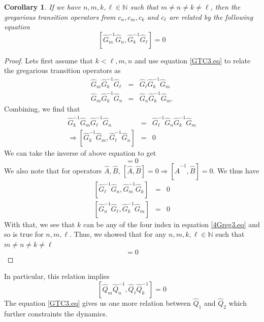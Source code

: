\documentclass[11pt]{article}
\newtheorem{corollary}[theorem]{Corollary}
\newcommand{\h}{\hat}
\begin{document}
\begin{corollary}
If we have $n,m,k,\ell\in \mathbb{N}$ such that $m\neq n \neq k \neq \ell $, then the gregarious transition operators from $c_n, c_m,c_k$ and $c_\ell$ are related by the following equation
\begin{equation}\label{4Greg3.eq}
[\h G_m^{-1}\h G_n,\h G_k^{-1}\h G_\ell]=0 
\end{equation}
\end{corollary}
\begin{proof}
Lets first assume that $k<\ell ,m,n$ and use equation \eqref{GTC3.eq} to relate the gregarious transition operators as 
\begin{eqnarray}
\h G_m\h G_k^{-1}\h G_\ell &=&\h G_\ell\h G_k^{-1}\h G_m\nonumber\\
\h G_m\h G_k^{-1}\h G_n&=&\h G_n\h G_k^{-1}\h G_m. 
\end{eqnarray}
Combining, we find that 
\begin{eqnarray}
\h G_k^{-1}\h G_m\h G_\ell^{-1}\h G_n&=& \h G_\ell^{-1}\h G_n\h G_k^{-1}\h G_m\\
\Rightarrow [\h G_k^{-1}\h G_m,\h G_\ell^{-1}\h G_n]&=&0
\end{eqnarray}
We can take the inverse of above equation to get
\begin{equation}
[\h G_n^{-1}\h G_\ell ,\h G_m^{-1}\h G_k]=0
\end{equation}
We also note that for operators $\h A ,\h B$, $[\h A,\h B]=0\Rightarrow [\h A^{-1},\h B]=0$. We thus have
\begin{eqnarray}
\left[\h G_\ell^{-1}\h G_n ,\h G_m^{-1}\h G_k\right]&=&0\\
\left[\h G_n^{-1}\h G_\ell ,\h G_k^{-1}\h G_m\right]&=&0
\end{eqnarray}
With that, we see that $k$ can be any of the four index in equation \eqref{4Greg3.eq} and so is true for $n,m,\ell$. Thus, we showed that for any $n,m,k,\ell\in \mathbb{N}$ such that $m\neq n \neq k \neq \ell $
\begin{equation}
[\h G_m^{-1}\h G_n,\h G_k^{-1}\h G_\ell]=0 
\end{equation}
\end{proof}

In particular, this relation implies 
\begin{equation}\label{eq: constraint}
[\h Q_m\h Q_n^{-1},\h Q_\ell \h Q_k^{-1}]=0
\end{equation}
The equation \eqref{GTC3.eq} gives us one more relation between $\h Q_1$ and $\h Q_2$ which further constraints the dynamics.
\end{document}
